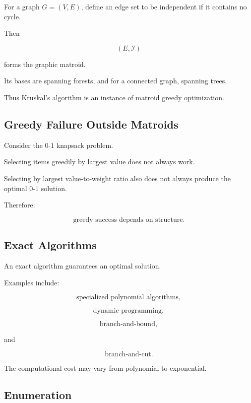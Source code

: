For a graph \(G=(V,E)\), define an edge set to be independent if it
contains no cycle.

Then

\[
\boxed{
(E,\mathcal{I})
}
\]

forms the graphic matroid.

Its bases are spanning forests, and for a connected graph, spanning
trees.

Thus Kruskal's algorithm is an instance of matroid greedy optimization.

\subsection{Greedy Failure Outside Matroids}
\label{subsec:greedy-failure-outside-matroids}

Consider the \(0\)-\(1\) knapsack problem.

Selecting items greedily by largest value does not always work.

Selecting by largest value-to-weight ratio also does not always produce
the optimal \(0\)-\(1\) solution.

Therefore:

\[
\boxed{
\text{greedy success depends on structure}.
}
\]

\subsection{Exact Algorithms}
\label{subsec:exact-combinatorial-algorithms}

An exact algorithm guarantees an optimal solution.

Examples include:

\[
\boxed{
\text{specialized polynomial algorithms},
}
\]

\[
\boxed{
\text{dynamic programming},
}
\]

\[
\boxed{
\text{branch-and-bound},
}
\]

and

\[
\boxed{
\text{branch-and-cut}.
}
\]

The computational cost may vary from polynomial to exponential.

\subsection{Enumeration}
\label{subsec:enumeration-combinatorial}

